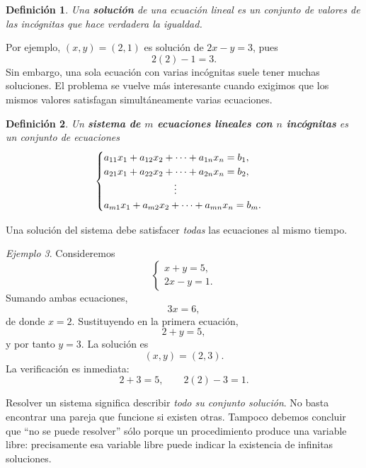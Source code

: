 \documentclass[12pt]{article}
\newtheorem{definicion}{Definición}[section]
\theoremstyle{remark}
\newtheorem{ejemplo}[definicion]{Ejemplo}
\begin{document}
\begin{definicion}
Una \textbf{solución} de una ecuación lineal es un conjunto de valores de las incógnitas que hace verdadera
la igualdad.
\end{definicion}

Por ejemplo, $(x,y)=(2,1)$ es solución de $2x-y=3$, pues
\[
2(2)-1=3.
\]
Sin embargo, una sola ecuación con varias incógnitas suele tener muchas soluciones. El problema se vuelve
más interesante cuando exigimos que los mismos valores satisfagan simultáneamente varias ecuaciones.
\begin{definicion}
Un \textbf{sistema de $m$ ecuaciones lineales con $n$ incógnitas} es un conjunto de ecuaciones
\[
\begin{cases}
a_{11}x_1+a_{12}x_2+\cdots+a_{1n}x_n=b_1,\\
a_{21}x_1+a_{22}x_2+\cdots+a_{2n}x_n=b_2,\\
\hspace{2.5cm}\vdots\\
a_{m1}x_1+a_{m2}x_2+\cdots+a_{mn}x_n=b_m.
\end{cases}
\]
\end{definicion}

Una solución del sistema debe satisfacer \emph{todas} las ecuaciones al mismo tiempo.

\begin{ejemplo}
Consideremos
\[
\begin{cases}
x+y=5,\\
2x-y=1.
\end{cases}
\]
Sumando ambas ecuaciones,
\[
3x=6,
\]
de donde $x=2$. Sustituyendo en la primera ecuación,
\[
2+y=5,
\]
y por tanto $y=3$. La solución es
\[
(x,y)=(2,3).
\]
La verificación es inmediata:
\[
2+3=5,\qquad 2(2)-3=1.
\]
\end{ejemplo}
Resolver un sistema significa describir \emph{todo su conjunto solución}. No basta encontrar una pareja que funcione si existen otras. Tampoco debemos concluir que ``no se puede resolver'' sólo porque un procedimiento produce una variable libre: precisamente esa variable libre puede indicar la existencia de infinitas soluciones.
\end{document}
